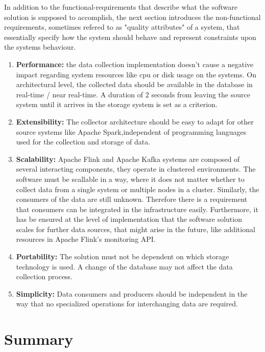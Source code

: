 In addition to the functional-requirements that describe what the software solution is supposed
to accomplish, the next section introduces the non-functional requirements, sometimes refered to as
"quality attributes" of a system, that essentially specify how the system should behave and represent
constraints upon the systems behaviour.

\begin{enumerate}
    \item \textbf{Performance:} the data collection implementation doesn't cause a negative impact regarding
    system resources like cpu or disk usage on the systems. On architectural level, the collected data should be
    available in the database in real-time / near real-time. A duration of 2 seconds from leaving the source system until
    it arrives in the storage system is set as a criterion.

    \item \textbf{Extensibility:} The collector architecture should be easy to adapt for other source systems
    like Apache Spark,independent of programming languages used for the collection and storage of data.

    \item \textbf{Scalability:} Apache Flink and Apache Kafka systems are composed of several interacting components, they
    operate in clustered environments. The software must be scallable in a way, where it does not matter whether to collect
    data from a single system or multiple nodes in a cluster. Similarly, the consumers of the data are still unknown. Therefore
    there is a requirement that consumers can be integrated in the infrastructure easily.
    Furthermore, it has be ensured at the level of implementation that the software solution scales for further data sources,
    that might arise in the future, like additional resources in Apache Flink's monitoring API.

    \item \textbf{Portability:} The solution must not be dependent on which storage technology is used. A change of the
    database may not affect the data collection process.

    \item \textbf{Simplicity:} Data consumers and producers should be independent in the way that no specialized operations
    for interchanging data are required.

\end{enumerate}

\section{Summary}